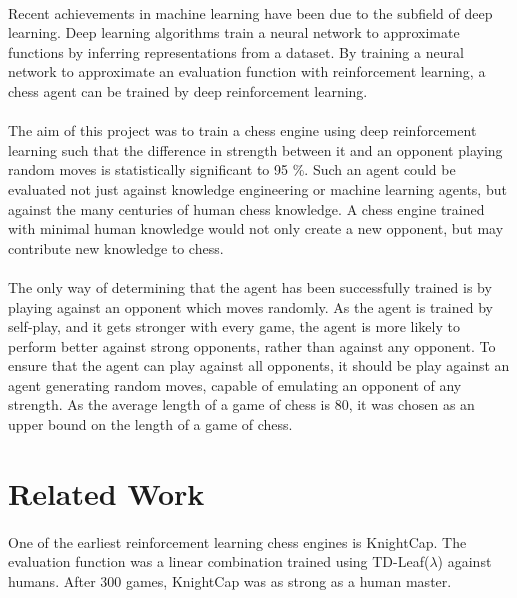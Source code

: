 \documentclass[12pt,a4paper]{book}
\begin{document}
\paragraph{} Recent achievements in machine learning have been due to the subfield of deep learning. Deep learning algorithms train a neural network to approximate functions by inferring representations from a dataset. \cite{deeplearn} By training a neural network to approximate an evaluation function with reinforcement learning, a chess agent can be trained by deep reinforcement learning. \cite{AlphaGo} \cite{DQN}

\paragraph{} The aim of this project was to train a chess engine using deep reinforcement learning such that the difference in strength between it and an opponent playing random moves is statistically significant to 95 \%. Such an agent could be evaluated not just against knowledge engineering or machine learning agents, but against the many centuries of human chess knowledge. A chess engine trained with minimal human knowledge would not only create a new opponent, but may contribute new knowledge to chess.

\paragraph{} The only way of determining that the agent has been successfully trained is by playing against an opponent which moves randomly. As the agent is trained by self-play, and it gets stronger with every game, the agent is more likely to perform better against strong opponents, rather than against any opponent. To ensure that the agent can play against all opponents, it should be play against an agent generating random moves, capable of emulating an opponent of any strength. As the average length of a game of chess is 80, it was chosen as an upper bound on the length of a game of chess.

\section{Related Work}

\paragraph{} One of the earliest reinforcement learning chess engines is KnightCap. The evaluation function was a linear combination trained using TD-Leaf($\lambda$) against humans. After 300 games, KnightCap was as strong as a human master. \cite{knightcap}
\end{document}
